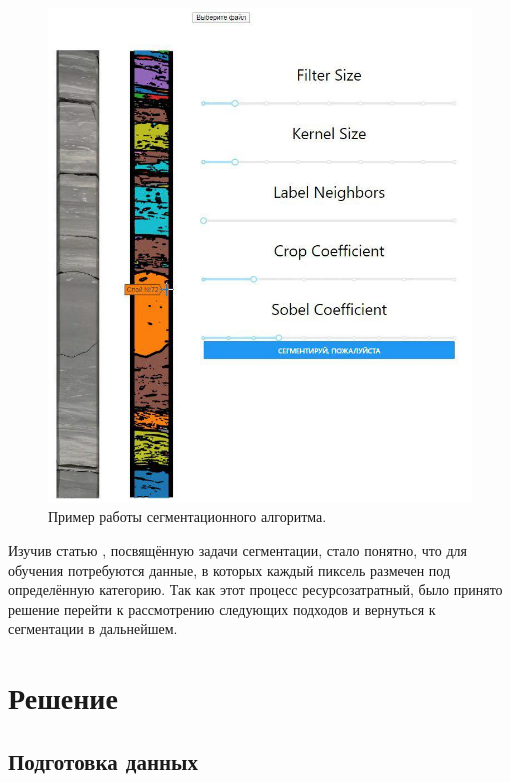 \documentclass[14pt]{matmex-diploma}
\begin{document}
        \begin{figure}[h]
            \centering
            \includegraphics[scale=0.35]{images/segmentation.jpg}
            \caption{Пример работы сегментационного алгоритма.}
            \label{segmentation}
        \end{figure}
        
        Изучив статью \cite{paper:segmentation}, посвящённую задачи сегментации, стало понятно, что для обучения потребуются данные, в которых каждый пиксель размечен под определённую категорию. Так как этот процесс ресурсозатратный, было принято решение перейти к рассмотрению следующих подходов и вернуться к сегментации в дальнейшем.  
        
        
        
        
        
\section{Решение}

    \subsection{Подготовка данных}
            
\end{document}

